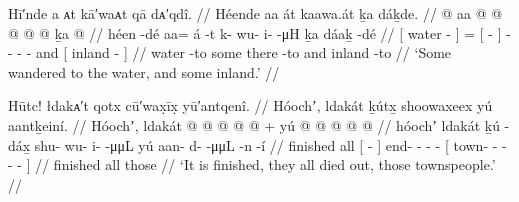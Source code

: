 \ex\label{ex:90-107-to-water-and-inland}%
%
\begingl
	\glpreamble	Hī′nde a ᴀt kā′waᴀt qā dᴀ′qdî. //
	\glpreamble	Héende aa át kaawa.át ḵa dáḵde. //
	\gla	{}  @ {} {}
		aa {}  @ {} {}  @ {} @ {} @ {} @ {}
		ḵa {}  @ {} {} //
	\glb	{} héen -dé {}
		aa= {} á -t {} k- wu- i-  -μH
		ḵa {} dáaḵ -dé {} //
	\glc	{}[ water - {}]
		= {}[  - {}] - - -  -
		and {}[ inland - {}]  //
	\gld	{} water -to {}
		some {} there -to {}  {} {} {} {}
		and {} inland -to {} //
	\glft	‘Some wandered to the water, and some inland.’
		//
\endgl
\xe

\ex\label{ex:90-108-done-all-died-out}%
%
\begingl
	\glpreamble	Hūtc! łdakᴀ′t qotx cū′wax̣īx̣ yū′antqenî. //
	\glpreamble	Hóochʼ, ldakát ḵútx̱ shoowaxeex yú aantḵeiní. //
	\gla	Hóochʼ,
		ldakát
		{}  @ {} {}  @ {} @ {} @ {} @ {} +
		{} yú  @ {} @ {} @ {} @ {} @ {} {} //
	\glb	hóochʼ
		ldakát
		{} ḵú -dáx̱ {} shu- wu- i-  -μμL
		{} yú aan- d-  -μμL -n -í {} //
	\glc	finished
		all
		{}[  - {}] end- - -  -
		{}[  town- -  - - - {}] //
	\gld	finished
		all
		{}  {} {}  {} {} {} {}
		{} those  {} {} {} {} {} {} //
	\glft	‘It is finished, they all died out, those townspeople.’
		//
\endgl
\xe

